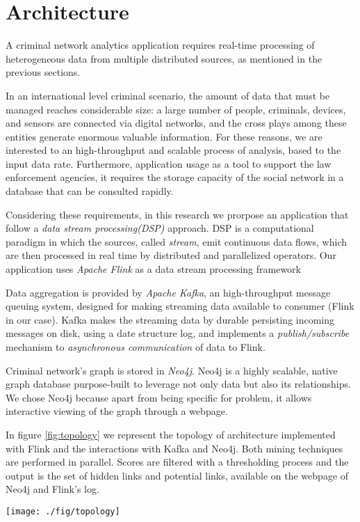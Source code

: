 \section{Architecture}
\label{sec:architecture}

A criminal network analytics application requires real-time processing of heterogeneous data from multiple distributed sources, as mentioned in the previous sections.

In an international level criminal scenario, the amount of data that must be managed reaches considerable size: a large number of people, criminals, devices, and sensors are connected via digital networks, and the cross plays among these entities generate enormous valuable information\cite{FrameworkBigdata}. For these reasons, we are interested to an high-throughput and scalable process of analysis, based to the input data rate.
Furthermore, application usage as a tool to support the law enforcement agencies, it requires the storage capacity of the social network in a database that can be consulted rapidly.

Considering these requirements, in this research we prorpose an application that follow a \textit{data stream processing(DSP)} approach. DSP is a computational paradigm in which the sources, called \textit{stream}, emit continuous data flows, which are then processed in real time by distributed and parallelized operators. Our application uses \textit{Apache Flink}\cite{flink} as a data stream processing framework 

Data aggregation is provided by \textit{Apache Kafka}\cite{kafka}, an high-throughput message queuing system, designed for making streaming data available to consumer (Flink in our case). Kafka makes the streaming data by durable persisting incoming messages on disk, using a date structure log, and implements a \textit{publish/subscribe} mechanism to \textit{asynchronous communication} of data to Flink.

Criminal network's graph is stored in \textit{Neo4j}\cite{neo4j}. Neo4j is a highly scalable, native graph database purpose-built to leverage not only data but also its relationships. We chose Neo4j because apart from being specific for problem, it allows interactive viewing of the graph through a webpage.

In figure \ref{fig:topology} we represent the topology of architecture implemented with Flink and the interactions with Kafka and Neo4j. Both mining techniques are performed in parallel. Scores are filtered with a thresholding process and the output is the set of hidden links and potential links, available on the webpage of Neo4j and Flink's log.
 

\begin{figure*}
\centering
\texttt{[image: ./fig/topology]}
\caption{The topology of architecture.}
\label{fig:topology}
\end{figure*}
